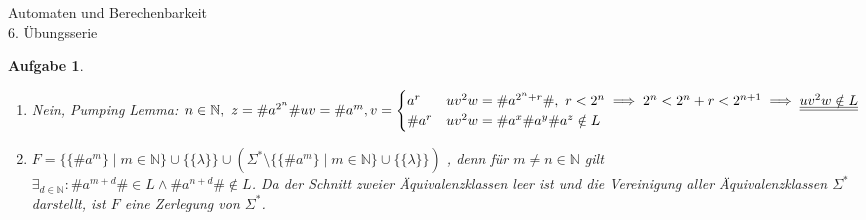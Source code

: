 \documentclass[11pt]{article}
\theoremstyle{break}
\newtheorem{task}{Aufgabe}
\begin{document}
\begin{center}
\Large{Automaten und Berechenbarkeit}\\
\large{6. Übungsserie}
\end{center}
\begin{task}
    \hfill\vspace{-5mm}
    \begin{enumerate}[label={(\alph*)}]
        \item Nein, Pumping Lemma: $n\in \mathbb{N},\ z = \#a^{2^n}\#\\ uv = \#a^m,
        v = 
        \begin{cases}
            a^r & uv^2 w = \#a^{2^n + r}\#,\ r < 2^n\implies 2^n < 2^n + r < 2^{n+1}\implies \underline{\underline{uv^2w \notin L}}\\
            \#a^r & uv^2w = \#a^x\#a^y\#a^z \notin L
        \end{cases}$
        \item $F = \{ \{ \#a^m\}\mid m\in \mathbb{N} \}\cup \{\{\lambda\}\}\cup (\Sigma^*\setminus\{ \{ \#a^m\}\mid m\in \mathbb{N} \}\cup \{\{\lambda\}\})$ , denn für $m\neq n \in \mathbb{N}$ gilt \\$\exists_{d\in \mathbb{N}}: \#a^{m+d}\#\in L \land \#a^{n+d}\#\notin L$. Da der Schnitt zweier Äquivalenzklassen leer ist und die Vereinigung aller Äquivalenzklassen $\Sigma^*$ darstellt, ist $F$ eine Zerlegung von $\Sigma^*$.
    \end{enumerate}
\end{task}
\end{document}
